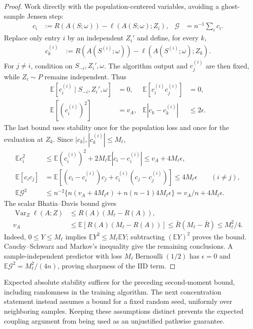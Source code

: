 \begin{proof}
Work directly with the population-centered variables, avoiding a ghost-sample Jensen step:
\begin{align}
 c_i&:=R(A(S;\omega))-\ell(A(S;\omega);Z_i),&
 \mathcal G&=n^{-1}\sum_i c_i.
\end{align}
Replace only entry $i$ by an independent $Z_i'$ and define, for every $k$,
\begin{align}
 c_k^{(i)}&:=R(A(S^{(i)};\omega))-\ell(A(S^{(i)};\omega);Z_k).
\end{align}
For $j\ne i$, condition on $S_{-i},Z_i',\omega$. The algorithm output and $c_j^{(i)}$ are then fixed, while $Z_i\sim P$ remains independent. Thus
\begin{align}
 \mathbb E[c_i^{(i)}\mid S_{-i},Z_i',\omega]&=0,&
 \mathbb E[c_i^{(i)}c_j^{(i)}]&=0,\\
 \mathbb E[(c_i^{(i)})^2]&=v_A,&
 \mathbb E|c_k-c_k^{(i)}|&\le2\epsilon.
\end{align}
The last bound uses stability once for the population loss and once for the evaluation at $Z_k$. Since $|c_k|,|c_k^{(i)}|\le M_\ell$,
\begin{align}
 \mathbb E c_i^2
 &\le\mathbb E(c_i^{(i)})^2+2M_\ell\mathbb E|c_i-c_i^{(i)}|
 \le v_A+4M_\ell\epsilon,\\
 \mathbb E[c_ic_j]
 &=\mathbb E[(c_i-c_i^{(i)})c_j+c_i^{(i)}(c_j-c_j^{(i)})]
 \le4M_\ell\epsilon\qquad(i\ne j),\\
 \mathbb E\mathcal G^2
 &\le n^{-2}\{n(v_A+4M_\ell\epsilon)+n(n-1)4M_\ell\epsilon\}
 =v_A/n+4M_\ell\epsilon.
\end{align}
The scalar Bhatia--Davis bound \citep{bhatia2000variance} gives
\begin{align}
 \operatorname{Var}_Z\ell(A;Z)&\le R(A)(M_\ell-R(A)),\\
 v_A&\le\mathbb E[R(A)(M_\ell-R(A))]
 \le\bar R(M_\ell-\bar R)\le M_\ell^2/4.
\end{align}
Indeed, $0\le Y\le M_\ell$ implies $\mathbb E Y^2\le M_\ell\mathbb E Y$; subtracting $(\mathbb E Y)^2$ proves the bound. Cauchy--Schwarz and Markov's inequality give the remaining conclusions. A sample-independent predictor with loss $M_\ell\operatorname{Bernoulli}(1/2)$ has $\epsilon=0$ and $\mathbb E\mathcal G^2=M_\ell^2/(4n)$, proving sharpness of the IID term.
\end{proof}

Expected absolute stability suffices for the preceding second-moment bound, including randomness in the training algorithm. The next concentration statement instead assumes a bound for a fixed random seed, uniformly over neighboring samples. Keeping these assumptions distinct prevents the expected coupling argument from being used as an unjustified pathwise guarantee.

